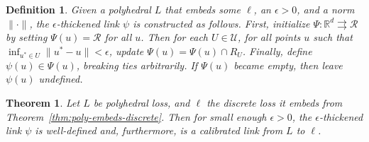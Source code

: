 \documentclass[12pt]{article}
\newcommand{\Comments}{1}
\newcommand{\mynote}[2]{\ifnum\Comments=1\textcolor{#1}{#2}\fi}
\newcommand{\mytodo}[2]{\ifnum\Comments=1%
  \todo[linecolor=#1!80!black,backgroundcolor=#1,bordercolor=#1!80!black]{#2}\fi}
\newcommand{\raf}[1]{\mynote{green}{[RF: #1]}}
\newcommand{\jessie}[1]{\mynote{purple}{[JF: #1]}}
\newcommand{\bo}[1]{\mynote{blue}{[Bo: #1]}}
\newcommand{\btw}[1]{}%
\newcommand{\reals}{\mathbb{R}}
\newcommand{\prop}[1]{\mathrm{prop}[#1]}
\newcommand{\simplex}{\Delta_\Y}
\newcommand{\R}{\mathcal{R}}
\newcommand{\U}{\mathcal{U}}
\newcommand{\Y}{\mathcal{Y}}
\newcommand{\toto}{\rightrightarrows}
\newtheorem{theorem}{Theorem}
\newtheorem{lemma}{Lemma}
\newtheorem{proposition}{Proposition}
\newtheorem{definition}{Definition}
\begin{document}

\begin{definition} \label{def:eps-thick-link}
  Given a polyhedral $L$ that embeds some $\ell$, an $\epsilon > 0$, and a norm $\|\cdot\|$, the \emph{$\epsilon$-thickened link} $\psi$ is constructed as follows.
  First, initialize $\Psi: \reals^d \toto \R$ by setting $\Psi(u) = \R$ for all $u$.
  Then for each $U \in \U$, for all points $u$ such that $\inf_{u^* \in U} \|u^*-u\| < \epsilon$, update $\Psi(u) = \Psi(u) \cap R_U$.
  Finally, define $\psi(u) \in \Psi(u)$, breaking ties arbitrarily.
  If $\Psi(u)$ became empty, then leave $\psi(u)$ undefined.
\end{definition}

\btw{JOURNAL: cool to point out that when $L$ is polyhedral, $\prop{L}$ has a finite range (this result) and so does its (multivalued map) inverse (trim result)!}


\begin{theorem}\label{thm:eps-thick-calibrated}
  Let $L$ be polyhedral loss, and $\ell$ the discrete loss it embeds from Theorem~\ref{thm:poly-embeds-discrete}.
  Then for small enough $\epsilon > 0$, the $\epsilon$-thickened link $\psi$ is well-defined and, furthermore, is a calibrated link from $L$ to $\ell$.
\end{theorem}
\end{document}
